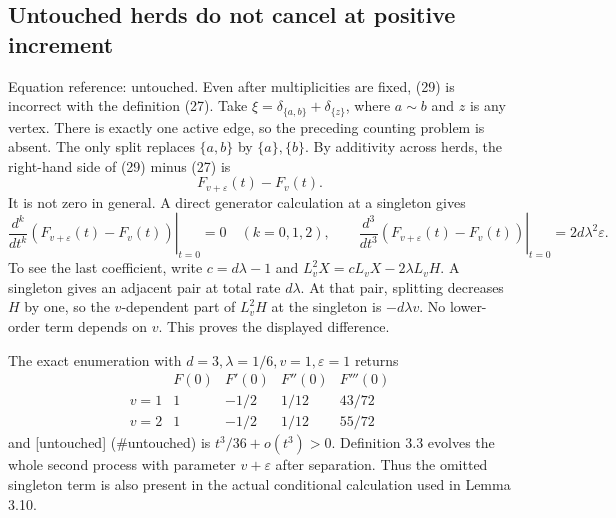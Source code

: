 \documentclass[10pt]{article}
\begin{document}
\subsection*{Untouched herds do not cancel at positive increment}
Equation reference: untouched. Even after multiplicities are fixed, (29) is incorrect with the definition (27). Take \(\xi=\delta_{\{a,b\}}+\delta_{\{z\}}\), where \(a\sim b\) and \(z\) is any vertex. There is exactly one active edge, so the preceding counting problem is absent. The only split replaces \(\{a,b\}\) by \(\{a\},\{b\}\). By additivity across herds, the right-hand side of (29) minus (27) is \[
 F_{v+\varepsilon}(t)-F_v(t).\] It is not zero in general. A direct generator calculation at a singleton gives \[\left.\frac{d^k}{dt^k}
   (F_{v+\varepsilon}(t)-F_v(t))\right|_{t=0}=0
 \quad (k=0,1,2),\qquad
 \left.\frac{d^3}{dt^3}
   (F_{v+\varepsilon}(t)-F_v(t))\right|_{t=0}
       =2d\lambda^2\varepsilon .\] To see the last coefficient, write \(c=d\lambda-1\) and \(L_v^2X=cL_vX-2\lambda L_vH\). A singleton gives an adjacent pair at total rate \(d\lambda\). At that pair, splitting decreases \(H\) by one, so the \(v\)-dependent part of \(L_v^2H\) at the singleton is \(-d\lambda v\). No lower-order term depends on \(v\). This proves the displayed difference.\par
The exact enumeration with \(d=3,\lambda=1/6,v=1,\varepsilon=1\) returns \[\begin{array}{c|rrrr}
 &F(0)&F'(0)&F''(0)&F'''(0)\\ \hline
 v=1&1&-1/2&1/12&43/72\\
 v=2&1&-1/2&1/12&55/72
 \end{array}\] and [untouched] (\#untouched) is \(t^3/36+o(t^3)>0\). Definition 3.3 evolves the whole second process with parameter \(v+\varepsilon\) after separation. Thus the omitted singleton term is also present in the actual conditional calculation used in Lemma 3.10.\par
\end{document}
